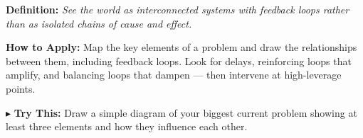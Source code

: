 \begin{tcolorbox}[title={\small \textbf{16 | Systems Thinking}},
  colback=blue!5!white, colframe=blue!40!black,
  fonttitle=\bfseries\small, boxrule=0.5pt]
\textbf{Definition:} \textit{See the world as interconnected systems with feedback loops rather than as isolated chains of cause and effect.}

\medskip
\textbf{How to Apply:} Map the key elements of a problem and draw the relationships between them, including feedback loops. Look for delays, reinforcing loops that amplify, and balancing loops that dampen --- then intervene at high-leverage points.

\medskip
$\blacktriangleright$ \textbf{Try This:} Draw a simple diagram of your biggest current problem showing at least three elements and how they influence each other.
\end{tcolorbox} 


